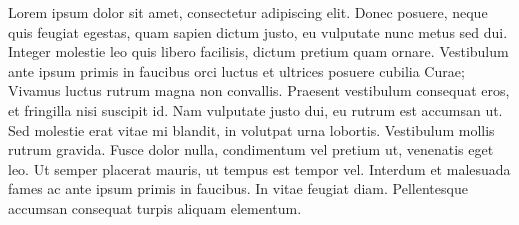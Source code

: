 Lorem ipsum dolor sit amet, consectetur adipiscing elit. Donec posuere, neque quis feugiat egestas, quam sapien dictum justo, eu vulputate nunc metus sed dui. Integer molestie leo quis libero facilisis, dictum pretium quam ornare. Vestibulum ante ipsum primis in faucibus orci luctus et ultrices posuere cubilia Curae; Vivamus luctus rutrum magna non convallis. Praesent vestibulum consequat eros, et fringilla nisi suscipit id. Nam vulputate justo dui, eu rutrum est accumsan ut. Sed molestie erat vitae mi blandit, in volutpat urna lobortis. Vestibulum mollis rutrum gravida. Fusce dolor nulla, condimentum vel pretium ut, venenatis eget leo. Ut semper placerat mauris, ut tempus est tempor vel. Interdum et malesuada fames ac ante ipsum primis in faucibus. In vitae feugiat diam. Pellentesque accumsan consequat turpis aliquam elementum.